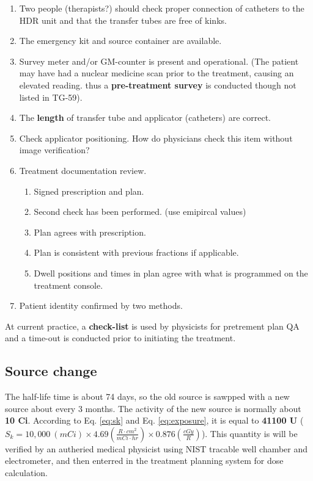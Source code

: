 \documentclass[]{book}
\providecommand{\tightlist}{%
  \setlength{\itemsep}{0pt}\setlength{\parskip}{0pt}}
\theoremstyle{definition}
\theoremstyle{definition}
\theoremstyle{definition}
\theoremstyle{remark}
\begin{document}
\begin{enumerate}
\def\labelenumi{\arabic{enumi}.}
\tightlist
\item
  Two people (therapists?) should check proper connection of catheters
  to the HDR unit and that the transfer tubes are free of kinks.
\item
  The emergency kit and source container are available.
\item
  Survey meter and/or GM-counter is present and operational. (The
  patient may have had a nuclear medicine scan prior to the treatment,
  causing an elevated reading. thus a \textbf{pre-treatment survey} is
  conducted though not listed in TG-59).
\item
  The \textbf{length} of transfer tube and applicator (catheters) are
  correct.
\item
  Check applicator positioning. How do physicians check this item
  without image verification?
\item
  Treatment documentation review.

  \begin{enumerate}
  \def\labelenumii{\alph{enumii}.}
  \tightlist
  \item
    Signed prescription and plan.
  \item
    Second check has been performed. (use emipircal values)
  \item
    Plan agrees with prescription.
  \item
    Plan is consistent with previous fractions if applicable.
  \item
    Dwell positions and times in plan agree with what is programmed on
    the treatment console.
  \end{enumerate}
\item
  Patient identity confirmed by two methods.
\end{enumerate}

At current practice, a \textbf{check-list} is used by physicists for
pretrement plan QA and a time-out is conducted prior to initiating the
treatment.

\subsection{Source change}\label{source-change}

The half-life time is about 74 days, so the old source is sawpped with a
new source about every 3 months. The activity of the new source is
normally about \textbf{10 Ci}. According to Eq. \eqref{eq:sk} and Eq.
\eqref{eq:exposure}, it is equal to \textbf{41100 U}
(\(S_k = 10,000\ (mCi) \times 4.69 \left(\frac{{R\cdot cm}^2}{mCi\cdot hr} \right) \times 0.876 \left(\frac{cGy}{R}\right)\)).
This quantity is will be verified by an autheried medical physicist
using NIST tracable well chamber and electrometer, and then enterred in
the treatment planning system for dose calculation.
\end{document}
